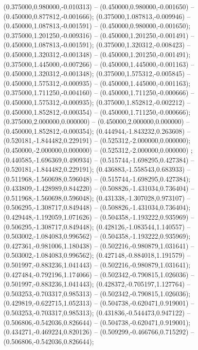  (0.375000,0.980000,-0.010313) -- (0.450000,0.980000,-0.001650) -- (0.450000,0.877812,-0.001666);
 (0.375000,1.087813,-0.009946) -- (0.450000,1.087813,-0.001591) -- (0.450000,0.980000,-0.001650);
 (0.375000,1.201250,-0.009316) -- (0.450000,1.201250,-0.001491) -- (0.450000,1.087813,-0.001591);
 (0.375000,1.320312,-0.008423) -- (0.450000,1.320312,-0.001348) -- (0.450000,1.201250,-0.001491);
 (0.375000,1.445000,-0.007266) -- (0.450000,1.445000,-0.001163) -- (0.450000,1.320312,-0.001348);
 (0.375000,1.575312,-0.005845) -- (0.450000,1.575312,-0.000935) -- (0.450000,1.445000,-0.001163);
 (0.375000,1.711250,-0.004160) -- (0.450000,1.711250,-0.000666) -- (0.450000,1.575312,-0.000935);
 (0.375000,1.852812,-0.002212) -- (0.450000,1.852812,-0.000354) -- (0.450000,1.711250,-0.000666);
 (0.375000,2.000000,0.000000) -- (0.450000,2.000000,0.000000) -- (0.450000,1.852812,-0.000354);
 (0.444944,-1.843232,0.263608) -- (0.520181,-1.844482,0.229191) -- (0.525312,-2.000000,0.000000);
 (0.450000,-2.000000,0.000000) -- (0.525312,-2.000000,0.000000) ;
 (0.440585,-1.696369,0.490934) -- (0.515744,-1.698295,0.427384) -- (0.520181,-1.844482,0.229191);
 (0.436883,-1.558543,0.683933) -- (0.511968,-1.560698,0.596048) -- (0.515744,-1.698295,0.427384);
 (0.433809,-1.428989,0.844220) -- (0.508826,-1.431034,0.736404) -- (0.511968,-1.560698,0.596048);
 (0.431338,-1.307028,0.973107) -- (0.506295,-1.308717,0.849448) -- (0.508826,-1.431034,0.736404);
 (0.429448,-1.192059,1.071626) -- (0.504358,-1.193222,0.935969) -- (0.506295,-1.308717,0.849448);
 (0.428126,-1.083544,1.140557) -- (0.503002,-1.084083,0.996562) -- (0.504358,-1.193222,0.935969);
 (0.427361,-0.981006,1.180438) -- (0.502216,-0.980879,1.031641) -- (0.503002,-1.084083,0.996562);
 (0.427148,-0.884018,1.191579) -- (0.501997,-0.883236,1.041443) -- (0.502216,-0.980879,1.031641);
 (0.427484,-0.792196,1.174066) -- (0.502342,-0.790815,1.026036) -- (0.501997,-0.883236,1.041443);
 (0.428372,-0.705197,1.127764) -- (0.503253,-0.703317,0.985313) -- (0.502342,-0.790815,1.026036);
 (0.429819,-0.622715,1.052313) -- (0.504738,-0.620471,0.919001) -- (0.503253,-0.703317,0.985313);
 (0.431836,-0.544473,0.947122) -- (0.506806,-0.542036,0.826644) -- (0.504738,-0.620471,0.919001);
 (0.434271,-0.469224,0.820126) -- (0.509299,-0.466766,0.715292) -- (0.506806,-0.542036,0.826644);
